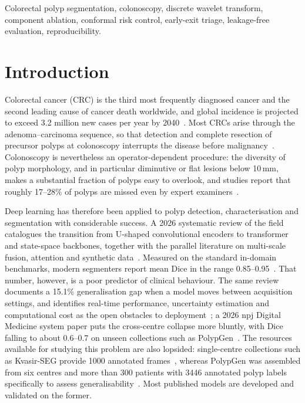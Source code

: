\documentclass[journal]{IEEEtran}
\begin{document}
\begin{abstract}
provenance bundle so that these claims can be re-derived rather than trusted.
\end{abstract}

\begin{IEEEkeywords}
Colorectal polyp segmentation, colonoscopy, discrete wavelet transform, component ablation, conformal risk control, early-exit triage, leakage-free evaluation, reproducibility.
\end{IEEEkeywords}

\section{Introduction}

Colorectal cancer (CRC) is the third most frequently diagnosed cancer and the second leading cause of cancer death worldwide, and global incidence is projected to exceed 3.2 million new cases per year by 2040~\cite{divya2026review}. Most CRCs arise through the adenoma--carcinoma sequence, so that detection and complete resection of precursor polyps at colonoscopy interrupts the disease before malignancy~\cite{divya2026review}. Colonoscopy is nevertheless an operator-dependent procedure: the diversity of polyp morphology, and in particular diminutive or flat lesions below 10\,mm, makes a substantial fraction of polyps easy to overlook, and studies report that roughly 17--28\% of polyps are missed even by expert examiners~\cite{xiao2026prysmnet}.

Deep learning has therefore been applied to polyp detection, characterisation and segmentation with considerable success. A 2026 systematic review of the field catalogues the transition from U-shaped convolutional encoders to transformer and state-space backbones, together with the parallel literature on multi-scale fusion, attention and synthetic data~\cite{divya2026review}. Measured on the standard in-domain benchmarks, modern segmenters report mean Dice in the range 0.85--0.95~\cite{xiao2026prysmnet}. That number, however, is a poor predictor of clinical behaviour. The same review documents a 15.1\% generalisation gap when a model moves between acquisition settings, and identifies real-time performance, uncertainty estimation and computational cost as the open obstacles to deployment~\cite{divya2026review}; a 2026 npj Digital Medicine system paper puts the cross-centre collapse more bluntly, with Dice falling to about 0.6--0.7 on unseen collections such as PolypGen~\cite{xiao2026prysmnet}. The resources available for studying this problem are also lopsided: single-centre collections such as Kvasir-SEG provide 1000 annotated frames~\cite{jha2020kvasir}, whereas PolypGen was assembled from six centres and more than 300 patients with 3446 annotated polyp labels specifically to assess generalisability~\cite{ali2023polypgen}. Most published models are developed and validated on the former.
\end{document}
